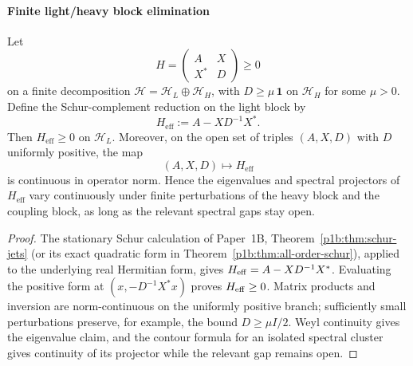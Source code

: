 \documentclass[12pt,a4paper]{article}
\begin{document}
\paragraph{Finite light/heavy block elimination}
\label{p4:sec:part2-block-elimination}

\begin{theorem}
\label{p4:thm:positive-block-elimination}
Let
\begin{equation}
\label{p4:eq:block-elimination-matrix}
H=
\begin{pmatrix}
A & X\\
X^* & D
\end{pmatrix}
\ge 0
\end{equation}
on a finite decomposition $\mathcal H=\mathcal H_L\oplus\mathcal H_H$, with $D\ge \mu\,\mathbf 1$ on $\mathcal H_H$ for some $\mu>0$.
Define the Schur-complement reduction on the light block by
\begin{equation}
\label{p4:eq:block-elimination-schur}
H_{\mathrm{eff}}:=A-XD^{-1}X^*.
\end{equation}
Then $H_{\mathrm{eff}}\ge 0$ on $\mathcal H_L$.
Moreover, on the open set of triples $(A,X,D)$ with $D$ uniformly positive, the map
\begin{equation}
\label{p4:eq:block-elimination-map}
(A,X,D)\longmapsto H_{\mathrm{eff}}
\end{equation}
is continuous in operator norm.
Hence the eigenvalues and spectral projectors of $H_{\mathrm{eff}}$ vary continuously under finite perturbations of the heavy block and the coupling block, as long as the relevant spectral gaps stay open.
\end{theorem}

\begin{proof}
The stationary Schur calculation of Paper~1B,
Theorem~\ref{p1b:thm:schur-jets} (or its exact quadratic form in
Theorem~\ref{p1b:thm:all-order-schur}), applied to the underlying real
Hermitian form, gives $H_{\rm eff}=A-XD^{-1}X^*$. Evaluating the positive
form at $(x,-D^{-1}X^*x)$ proves $H_{\rm eff}\ge0$.
Matrix products and inversion are norm-continuous on the uniformly
positive branch; sufficiently small perturbations preserve, for example,
the bound $D\ge\mu I/2$. Weyl continuity gives the eigenvalue claim,
and the contour formula for an isolated spectral cluster gives continuity
of its projector while the relevant gap remains open.
\end{proof}
\end{document}
